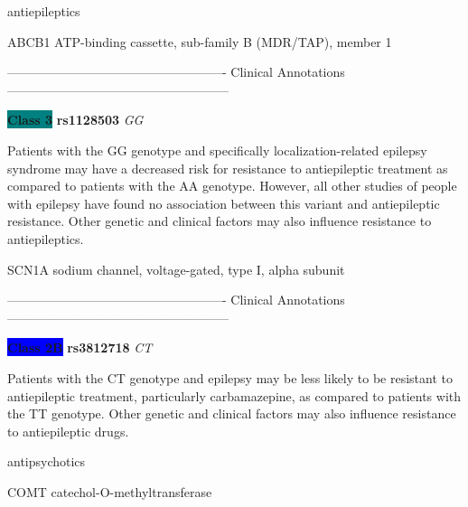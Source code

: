 \documentclass{resume} %
\begin{document}
\begin{rSection}{ antiepileptics }
\begin{rSubsection}{ ABCB1 }{ ATP-binding cassette, sub-family B (MDR/TAP), member 1 }{}{}
\item[] ---------------------------------------------------- Clinical Annotations -----------------------------------------------------\newline
\item \textbf{\colorbox{teal} {Class 3}} \textbf{ rs1128503 } \textit{ GG }
\item[] Patients with the GG genotype and specifically localization-related epilepsy syndrome may have a decreased risk for resistance to antiepileptic treatment as compared to patients with the AA genotype. However, all other studies of people with epilepsy have found no association between this variant and antiepileptic resistance. Other genetic and clinical factors may also influence resistance to antiepileptics. 
\end{rSubsection}\begin{rSubsection}{ SCN1A }{ sodium channel, voltage-gated, type I, alpha subunit }{}{}
\item[]

\item[] ---------------------------------------------------- Clinical Annotations -----------------------------------------------------\newline
\item \textbf{\colorbox{blue} {Class 2B}} \textbf{ rs3812718 } \textit{ CT }
\item[] Patients with the CT genotype and epilepsy may be less likely to be resistant to antiepileptic treatment, particularly carbamazepine, as compared to patients with the TT genotype. Other genetic and clinical factors may also influence resistance to antiepileptic drugs.
\end{rSubsection}

\end{rSection}\begin{rSection}{ antipsychotics }
\item[]

\begin{rSubsection}{ COMT }{ catechol-O-methyltransferase }{}{}
\item[]


\end{rSubsection}
\end{rSection}
\end{document}
